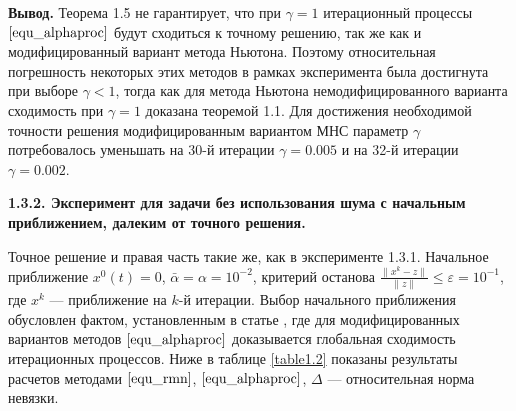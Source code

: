{\bfseries\large Вывод.} Теорема 1.5 не гарантирует, что при $\gamma=1$ итерационный процессы $\eqref{equ_alphaproc}$ будут сходиться к точному решению, так же как и модифицированный вариант метода Ньютона. Поэтому относительная погрешность некоторых этих методов в рамках эксперимента была достигнута при выборе $\gamma<1$, тогда как для метода Ньютона немодифицированного варианта сходимость при $\gamma=1$ доказана теоремой 1.1. Для достижения необходимой точности решения модифицированным вариантом МНС параметр $\gamma$ потребовалось уменьшать на 30-й итерации $\gamma=0.005$ и на 32-й итерации $\gamma=0.002$.

{\bfseries 1.3.2. Эксперимент для задачи без использования шума с начальным приближением, далеким от точного решения.} 

Точное решение и правая часть такие же, как в эксперименте 1.3.1.  Начальное приближение $x^0(t)=0$, $\bar\alpha=\alpha=10^{-2}$, критерий останова $\frac{\|x^k-z\|}{\|z\|}\le\varepsilon=10^{-1}$, где $x^k$ --- приближение на $k$-й итерации. Выбор начального приближения обусловлен фактом, установленным в статье \cite{Vasin2016}, где для модифицированных вариантов методов $\eqref{equ_alphaproc}$ доказывается глобальная сходимость итерационных процессов.%
Ниже в таблице \ref{table1.2} показаны результаты расчетов методами $\eqref{equ_rmn}$, $\eqref{equ_alphaproc}$, $\Delta$ --- относительная норма невязки. 
